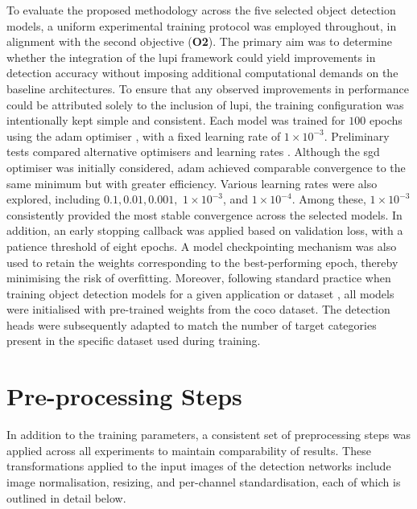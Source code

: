 To evaluate the proposed methodology across the five selected object detection models, a uniform experimental training protocol was employed throughout, in alignment with the second objective (\textbf{O2}). The primary aim was to determine whether the integration of the \gls{lupi} framework could yield improvements in detection accuracy without imposing additional computational demands on the baseline architectures. To ensure that any observed improvements in performance could be attributed solely to the inclusion of \gls{lupi}, the training configuration was intentionally kept simple and consistent. Each model was trained for $100$ epochs using the \gls{adam} optimiser \cite{adam_optimizer}, with a fixed learning rate of \(1 \times 10^{-3}\).
Preliminary tests compared alternative optimisers and learning rates \cite{sgd_optimizer}. Although the \gls{sgd} optimiser was initially considered, \gls{adam} achieved comparable convergence to the same minimum but with greater efficiency. Various learning rates were also explored, including $0.1, 0.01, 0.001,$ \(1 \times 10^{-3}\), and \(1 \times 10^{-4}\). Among these, \(1 \times 10^{-3}\) consistently provided the most stable convergence across the selected models. 
In addition, an early stopping callback was applied based on validation loss, with a patience threshold of eight epochs. A model checkpointing mechanism was also used to retain the weights corresponding to the best-performing epoch, thereby minimising the risk of overfitting.
Moreover, following standard practice when training object detection models for a given application or dataset \cite{yolov12, soda_dataset, fasterrcnn, yolov10}, all models were initialised with pre-trained weights from the \gls{coco} dataset. The detection heads were subsequently adapted to match the number of target categories present in the specific dataset used during training.

\section{Pre-processing Steps}
\label{sec:4_preprocessing}

In addition to the training parameters, a consistent set of preprocessing steps was applied across all experiments to maintain comparability of results. These transformations applied to the input images of the detection networks include image normalisation, resizing, and per-channel standardisation, each of which is outlined in detail below.

